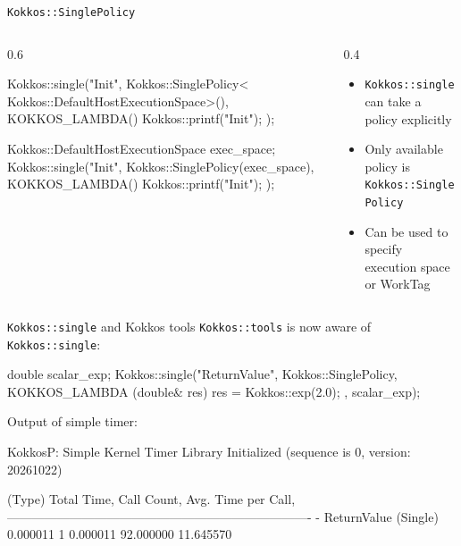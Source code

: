 \begin{frame}[fragile]{\texttt{Kokkos::SinglePolicy}}
  \begin{columns}
    \begin{column}{0.6\linewidth}
      \begin{code}[keywords={KOKKOS_LAMBDA,parallel_for,single, SinglePolicy}]
  Kokkos::single("Init",
    Kokkos::SinglePolicy<
        Kokkos::DefaultHostExecutionSpace>(),
    KOKKOS_LAMBDA() {
        Kokkos::printf("Init\n");
    }
  );

  Kokkos::DefaultHostExecutionSpace exec_space;
  Kokkos::single("Init",
    Kokkos::SinglePolicy(exec_space),
    KOKKOS_LAMBDA() {
        Kokkos::printf("Init\n");
    }
  );
      \end{code}
    \end{column}
    \begin{column}{0.4\linewidth}
      \begin{itemize}
        \item \texttt{Kokkos::single} can take a policy explicitly
        \item Only available policy is \texttt{Kokkos::SinglePolicy}
        \item Can be used to specify execution space or WorkTag
      \end{itemize}
    \end{column}
  \end{columns}
\end{frame}

\begin{frame}[fragile]{\texttt{Kokkos::single} and Kokkos tools}
  \texttt{Kokkos::tools} is now aware of \texttt{Kokkos::single}:
      \begin{code}[keywords={KOKKOS_LAMBDA,parallel_for,single, SinglePolicy}]
double scalar_exp;
Kokkos::single("ReturnValue", Kokkos::SinglePolicy{},
  KOKKOS_LAMBDA (double& res) {
    res = Kokkos::exp(2.0);
}, scalar_exp);
      \end{code}

      \vspace{1em}

      Output of simple timer:
      \begin{code}
KokkosP: Simple Kernel Timer Library Initialized (sequence is 0, version: 20261022)

(Type)   Total Time, Call Count, Avg. Time per Call, %
-------------------------------------------------------------------------
- ReturnValue
 (Single)  0.000011 1 0.000011 92.000000 11.645570
      \end{code}
\end{frame}


